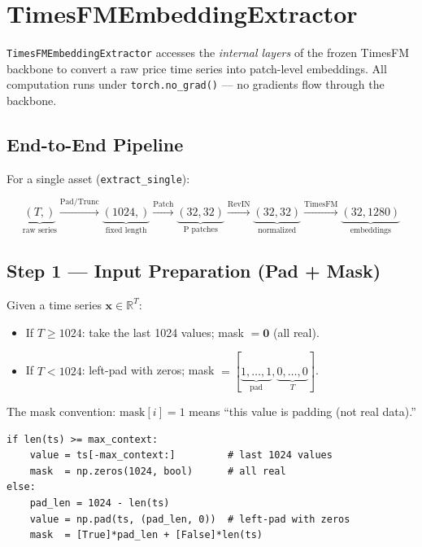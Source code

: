 \documentclass[11pt,a4paper]{article}
\begin{document}
\section{TimesFMEmbeddingExtractor}

\texttt{TimesFMEmbeddingExtractor} accesses the \emph{internal layers} of the frozen TimesFM backbone to convert a raw price time series into patch-level embeddings. All computation runs under \texttt{torch.no\_grad()} --- no gradients flow through the backbone.

\subsection{End-to-End Pipeline}

For a single asset (\texttt{extract\_single}):

\[
\underbrace{(T,)}_{\text{raw series}}
\xrightarrow{\text{Pad/Trunc}}
\underbrace{(1024,)}_{\text{fixed length}}
\xrightarrow{\text{Patch}}
\underbrace{(32, 32)}_{\text{P patches}}
\xrightarrow{\text{RevIN}}
\underbrace{(32, 32)}_{\text{normalized}}
\xrightarrow{\text{TimesFM}}
\underbrace{(32, 1280)}_{\text{embeddings}}
\]

\subsection{Step 1 --- Input Preparation (Pad + Mask)}

Given a time series $\mathbf{x} \in \mathbb{R}^T$:

\begin{itemize}[nosep]
    \item If $T \geq 1024$: take the last 1024 values; mask $= \mathbf{0}$ (all real).
    \item If $T < 1024$: left-pad with zeros; mask $= [\underbrace{1,\ldots,1}_{\text{pad}},\underbrace{0,\ldots,0}_{T}]$.
\end{itemize}

\noindent
The mask convention: $\text{mask}[i] = 1$ means ``this value is padding (not real data).''

\begin{lstlisting}
if len(ts) >= max_context:
    value = ts[-max_context:]         # last 1024 values
    mask  = np.zeros(1024, bool)      # all real
else:
    pad_len = 1024 - len(ts)
    value = np.pad(ts, (pad_len, 0))  # left-pad with zeros
    mask  = [True]*pad_len + [False]*len(ts)
\end{lstlisting}
\end{document}
